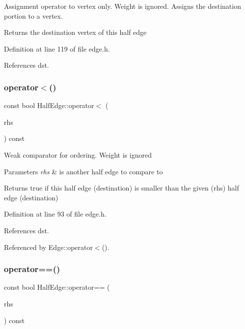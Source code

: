 Assignment operator to vertex only. Weight is ignored. Assigns the destination portion to a vertex. \begin{DoxyReturn}{Returns}
the destination vertex of this half edge 
\end{DoxyReturn}


Definition at line 119 of file edge.\+h.



References dst.

\mbox{\label{classHalfEdge_a29e0306074978afc471a058273cb5162}} 
\subsubsection{\texorpdfstring{operator$<$()}{operator<()}}
{\footnotesize\ttfamily const bool Half\+Edge\+::operator$<$ (\begin{DoxyParamCaption}\item[{const \hyperlink{classHalfEdge}{Half\+Edge} \&}]{rhs }\end{DoxyParamCaption}) const\hspace{0.3cm}{\ttfamily [inline]}}

Weak comparator for ordering. Weight is ignored 
\begin{DoxyParams}{Parameters}
{\em rhs} & is another half edge to compare to \\
\hline
\end{DoxyParams}
\begin{DoxyReturn}{Returns}
true if this half edge (destination) is smaller than the given (rhs) half edge (destination) 
\end{DoxyReturn}


Definition at line 93 of file edge.\+h.



References dst.



Referenced by Edge\+::operator$<$().

\mbox{\label{classHalfEdge_a23ac17482f740af513d141c77361cd37}} 
\subsubsection{\texorpdfstring{operator==()}{operator==()}\hspace{0.1cm}{\footnotesize\ttfamily [1/2]}}
{\footnotesize\ttfamily const bool Half\+Edge\+::operator== (\begin{DoxyParamCaption}\item[{const \hyperlink{classHalfEdge}{Half\+Edge} \&}]{rhs }\end{DoxyParamCaption}) const\hspace{0.3cm}{\ttfamily [inline]}}

